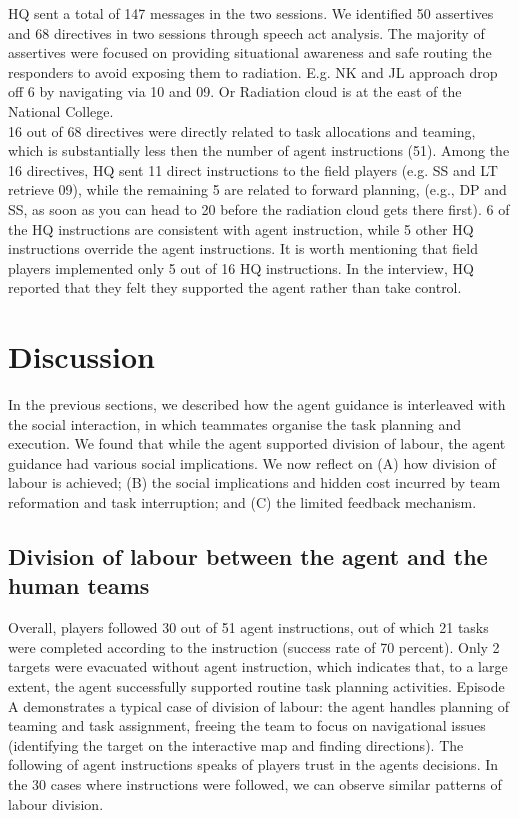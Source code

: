 HQ sent a total of 147 messages in the two sessions. We identified 50 assertives and 68 directives in two sessions through speech act analysis. The majority of assertives were focused on providing situational awareness and safe routing the responders to avoid exposing them to radiation. E.g. NK and JL approach drop off 6 by navigating via 10 and 09. Or Radiation cloud is at the east of the National College.\\

16 out of 68 directives were directly related to task allocations and teaming, which is substantially less then the number of agent instructions (51). Among the 16 directives, HQ sent 11 direct instructions to the field players (e.g. SS and LT retrieve 09), while the remaining 5 are related to forward planning, (e.g., DP and SS, as soon as you can head to 20 before the radiation cloud gets there first). 6 of the HQ instructions are consistent with agent instruction, while 5 other HQ instructions override the agent instructions. It is worth mentioning that field players implemented only 5 out of 16 HQ instructions. In the interview, HQ reported that they felt they supported the agent rather than take control. 

\section{Discussion}
In the previous sections, we described how the agent guidance is interleaved with the social interaction, in which teammates organise the task planning and execution. We found that while the agent supported division of labour, the agent guidance had various social implications. We now reflect on (A) how division of labour is achieved; (B) the social implications and hidden cost incurred by team reformation and task interruption; and (C) the limited feedback mechanism. \\

\subsection{Division of labour between the agent and the human teams}
Overall, players followed 30 out of 51 agent instructions, out of which 21 tasks were completed according to the instruction (success rate of 70 percent). Only 2 targets were evacuated without agent instruction, which indicates that, to a large extent, the agent successfully supported routine task planning activities. Episode A demonstrates a typical case of division of labour: the agent handles planning of teaming and task assignment, freeing the team to focus on navigational issues (identifying the target on the interactive map and finding directions). The following of agent instructions speaks of players trust in the agents decisions. In the 30 cases where instructions were followed, we can observe similar patterns of labour division.\\


